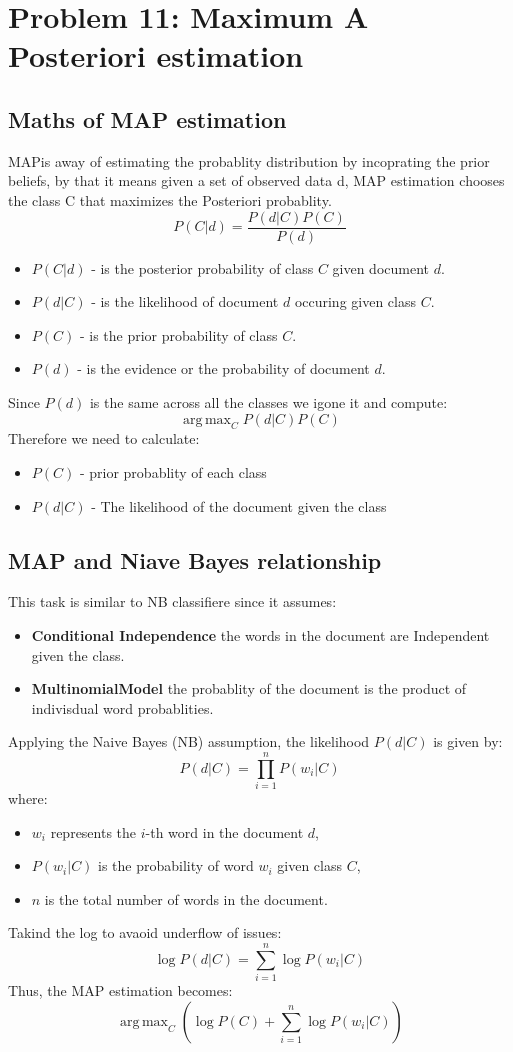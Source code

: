 \documentclass{article}
\DeclareMathOperator*{\argmax}{arg\,max}
\begin{document}
\section*{Problem 11: Maximum A Posteriori estimation}
\subsection*{Maths of MAP estimation}
MAPis away of estimating the probablity distribution by incoprating the prior beliefs, by that it means given a set of observed data d,
MAP estimation chooses the class C that maximizes the Posteriori probablity.
\[
P(C|d) = \frac{P(d|C)P(C)}{P(d)}
\]
\begin{itemize}
    \item \(P(C|d)\) - is the posterior probability of class \(C\) given document \(d\).
    \item \(P(d|C)\) - is the likelihood of document \(d\) occuring given class \(C\).
    \item \(P(C)\) - is the prior probability of class \(C\).
    \item \(P(d)\) - is the evidence or the probability of document \(d\).
\end{itemize}
Since \(P(d)\) is the same across all the classes we igone it and compute:
\[
\argmax_C P(d|C)P(C)
\]
Therefore we need to calculate:
\begin{itemize}
    \item \(P(C)\) - prior probablity of each class
    \item \(P(d|C)\) - The likelihood of the document given the class
\end{itemize}

\subsection*{MAP and Niave Bayes relationship}
This task is similar to NB classifiere since it assumes:
\begin{itemize}
    \item \textbf{Conditional Independence} the words in the document are Independent given the class.
    \item \textbf{MultinomialModel} the probablity of the document is the product of indivisdual word probablities.
\end{itemize}
Applying the Naive Bayes (NB) assumption, the likelihood \(P(d|C)\) is given by:
\[
P(d|C) = \prod_{i=1}^{n} P(w_i|C)
\]
where:
\begin{itemize}
    \item \(w_i\) represents the \(i\)-th word in the document \(d\),
    \item \(P(w_i|C)\) is the probability of word \(w_i\) given class \(C\),
    \item \(n\) is the total number of words in the document.
\end{itemize}
Takind the log to avaoid underflow of issues:
\[
\log P(d|C) = \sum_{i=1}^{n} \log P(w_i|C)
\]
Thus, the MAP estimation becomes:
\[
\argmax_C \left( \log P(C) + \sum_{i=1}^{n} \log P(w_i|C) \right)
\]
\end{document}
